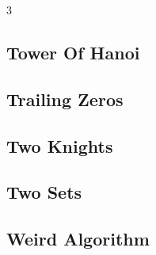 \documentclass[8pt]{extarticle}
\begin{document}
\begin{multicols*}{3}
\subsection{Tower Of Hanoi}
\begin{caixaenunciado}

\end{caixaenunciado}
\vspace{0.3cm}


\subsection{Trailing Zeros}
\begin{caixaenunciado}

\end{caixaenunciado}
\vspace{0.3cm}


\subsection{Two Knights}
\begin{caixaenunciado}

\end{caixaenunciado}
\vspace{0.3cm}


\subsection{Two Sets}
\begin{caixaenunciado}

\end{caixaenunciado}
\vspace{0.3cm}


\subsection{Weird Algorithm}
\begin{caixaenunciado}

\end{caixaenunciado}
\vspace{0.3cm}

\end{multicols*}
\end{document}

